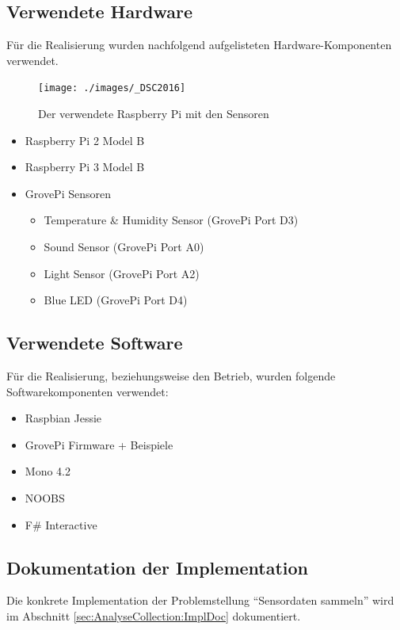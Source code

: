 \subsection{Verwendete Hardware}
Für die Realisierung wurden nachfolgend aufgelisteten Hardware-Komponenten verwendet.

\begin{figure}[H]
  \centering
  \texttt{[image: ./images/\_DSC2016]}
  \caption{Der verwendete Raspberry Pi mit den Sensoren}
\end{figure}

\begin{itemize}
\item Raspberry Pi 2 Model B
\item Raspberry Pi 3 Model B
\item GrovePi Sensoren
\begin{itemize}
\item Temperature \& Humidity Sensor (GrovePi Port D3)
\item Sound Sensor (GrovePi Port A0)
\item Light Sensor (GrovePi Port A2)
\item Blue LED (GrovePi Port D4)
\end{itemize}
\end{itemize}




\subsection{Verwendete Software}
Für die Realisierung, beziehungsweise den Betrieb, wurden folgende Softwarekomponenten verwendet:

\begin{itemize}
\item Raspbian Jessie
\item GrovePi Firmware + Beispiele
\item Mono 4.2
\item NOOBS
\item F\# Interactive
\end{itemize}

\subsection{Dokumentation der Implementation}
Die konkrete Implementation der Problemstellung "`Sensordaten sammeln"' wird im Abschnitt \ref{sec:AnalyseCollection:ImplDoc}  dokumentiert.


